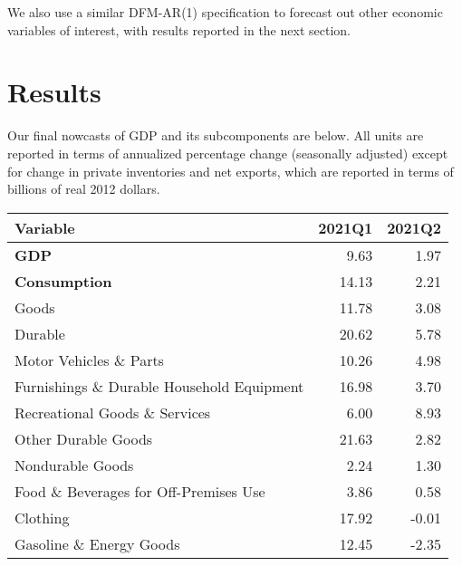 \documentclass[11pt, letterpaper]{article}\usepackage[]{graphicx}\usepackage[]{color}
\begin{document}
We also use a similar DFM-AR(1) specification to forecast out other economic variables of interest, with results reported in the next section.


\section{Results}
Our final nowcasts of GDP and its subcomponents are below. All units are reported in terms of annualized percentage change (seasonally adjusted) except for change in private inventories and net exports, which are reported in terms of billions of real 2012 dollars.
\begin{table}[H]
\centering
\begingroup\fontsize{10pt}{12pt}\selectfont
\begin{tabular}{lrr}
  \hline
Variable & 2021Q1 & 2021Q2 \\ 
  \hline
\hspace{0mm} \textbf{GDP} & 9.63 & 1.97 \\ 
  \hspace{0mm} \textbf{Consumption} & 14.13 & 2.21 \\ 
  \hspace{8mm}  Goods & 11.78 & 3.08 \\ 
  \hspace{16mm}  Durable & 20.62 & 5.78 \\ 
  \hspace{24mm}  Motor Vehicles \& Parts & 10.26 & 4.98 \\ 
  \hspace{24mm}  Furnishings \& Durable Household Equipment & 16.98 & 3.70 \\ 
  \hspace{24mm}  Recreational Goods \& Services & 6.00 & 8.93 \\ 
  \hspace{24mm}  Other Durable Goods & 21.63 & 2.82 \\ 
  \hspace{16mm}  Nondurable Goods & 2.24 & 1.30 \\ 
  \hspace{24mm}  Food \& Beverages for Off-Premises Use & 3.86 & 0.58 \\ 
  \hspace{24mm}  Clothing & 17.92 & -0.01 \\ 
  \hspace{24mm}  Gasoline \& Energy Goods & 12.45 & -2.35 \\ 

\end{tabular}
\end{table}
\end{document}
